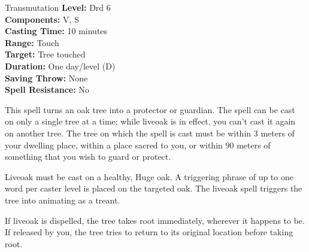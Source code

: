 {Transmutation}
{
	\textbf{Level:}
	Drd 6\\
	\textbf{Components:}
	V, S\\
	\textbf{Casting Time:}
	10 minutes\\
	\textbf{Range:}
	Touch\\
	\textbf{Target:}
	Tree touched\\
	\textbf{Duration:}
	One day/level (D)\\
	\textbf{Saving Throw:}
	None\\
	\textbf{Spell Resistance:}
	No\\
}
{
	This spell turns an oak tree into a protector or guardian. The spell can be cast on only a single tree at a time; while liveoak is in effect, you can't cast it again on another tree. The tree on which the spell is cast must be within 3 meters of your dwelling place, within a place sacred to you, or within 90 meters of something that you wish to guard or protect.

	Liveoak must be cast on a healthy, Huge oak. A triggering phrase of up to one word per caster level is placed on the targeted oak. The liveoak spell triggers the tree into animating as a treant.

	If liveoak is dispelled, the tree takes root immediately, wherever it happens to be. If released by you, the tree tries to return to its original location before taking root.

}
